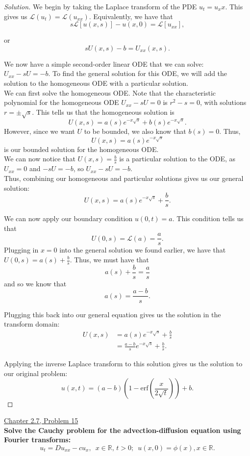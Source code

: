 \documentclass[11pt]{article}
\newenvironment{solution}
  {\renewcommand\qedsymbol{$\blacksquare$}\begin{proof}[Solution]}
  {\end{proof}}
\begin{document}
\begin{solution}
We begin by taking the Laplace transform of the PDE $u_t = u_xx.$ This gives us $ \mathcal{L}(u_t) = \mathcal{L}(u_{xx}).$ Equivalently, we have that
\[ s\mathcal{L}[u(x, s)] - u(x, 0) = \mathcal{L}[u_{xx}],\]

or \[sU(x, s) - b = U_{xx}(x, s).\]

We now have a simple second-order linear ODE that we can solve: $U_{xx} - sU = -b.$ To find the general solution for this ODE, we will add the solution to the homogeneous ODE with a particular solution. \\

We can first solve the homogeneous ODE. Note that the characteristic polynomial for the homogeneous ODE  $U_{xx} - sU = 0$ is $r^2 - s =0$, with solutions $r = \pm \sqrt{s}.$ This tells us that the homogeneous solution is \[U(x, s) = a(s)e^{-x\sqrt{s}} + b(s)e^{-x\sqrt{s}}.\]
However, since we want $U$ to be bounded, we also know that $b(s) = 0$. Thus, \[U(x, s) = a(s)e^{-x\sqrt{s}}\] is our bounded solution for the homogeneous ODE. \\

We can now notice that $U(x, s) = \frac{b}{s}$ is a particular solution to the ODE, as $U_{xx} = 0$ and $-sU = -b$, so $U_{xx} - sU = -b.$ \\

Thus, combining our homogeneous and particular solutions gives us our general solution:
\[ U(x, s) = a(s)e^{-x\sqrt{s}} + \frac{b}{s}. \]

We can now apply our boundary condition $u(0, t) = a.$ This condition tells us that \[U(0, s) = \mathcal{L}(a) = \frac{a}{s}.\]
Plugging in $x=0$ into the general solution we found earlier, we have that $U(0, s) = a(s) + \frac{b}{s}$. Thus, we must have that
\[a(s) + \frac{b}{s} = \frac{a}{s} \]
and so we know that \[a(s) = \frac{a-b}{s}.\]

Plugging this back into our general equation gives us the solution in the transform domain:
\begin{align*} U(x, s) &= a(s)e^{-x\sqrt{s}} + \frac{b}{s} \\ &= \frac{a-b}{s}e^{-x\sqrt{s}} + \frac{b}{s}.\end{align*}

Applying the inverse Laplace transform to this solution gives us the solution to our original problem:
\[\boxed{u(x, t) = (a-b)\left( 1 - \mathrm{erf}\left( \frac{x}{2\sqrt{t}}\right)\right) + b}.\]
\end{solution}


\newpage


\underline{Chapter 2.7, Problem 15} \\

\textbf{Solve the Cauchy problem for the advection-diffusion equation using Fourier transforms:}
\[u_t = Du_{xx} - cu_x, \, \, \, x \in \mathbb{R}, \, t>0; \, \, \, u(x,0)=\phi(x), x\in\mathbb{R}.\]
\end{document}
